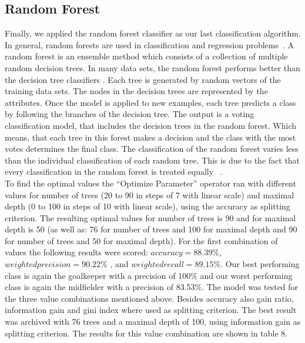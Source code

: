 \subsection{Random Forest}
Finally, we applied the random forest classifier as our last classification algorithm. In general, random forests are used in classification and regression problems~\cite{ref_rapidminerRandomForest}.
A random forest is an ensemble method which consists of a collection of multiple random decision trees. In many data sets, the random forest performs better than the decision tree classifiers \cite{ref_Tan}. 
Each tree is generated by random vectors of the training data sets. The nodes in the decision trees are represented by the attributes. \newline 
Once the model is applied to new examples, each tree predicts a class by following the branches of the decision tree. The output is a voting classification model, that includes the decision trees in the random forest. Which means, that each tree in this forest makes a decision and the class with the most votes determines the final class. The classification of the random forest varies less than the individual classification of each random tree. This is due to the fact that every classification in the random forest is treated equally ~\cite{ref_rapidminerRandomForest}. \\
To find the optimal values the ``Optimize Parameter'' operator ran with different values for number of trees (20 to 90 in steps of 7 with linear scale) and maximal depth (0 to 100 in steps of 10 with linear scale), using the accuracy as splitting criterion. The resulting optimal values for number of trees is 90 and for maximal depth is 50 (as well as: 76 for number of trees and 100 for maximal depth and 90 for number of trees and 50 for maximal depth). 
For the first combination of values the following results were scored: $accuracy = 88.39\%$, $weighted precision = 90.22\%$ , and $weighted recall = 89.15\%$. Our best performing class is again the goalkeeper with a precision of 100\% and our worst performing class is again the midfielder with a precision of 83.53\%. The model was tested for the three
value combinations mentioned above. 
Besides accuracy also gain ratio, information gain and gini index where used as splitting criterion. 
The best result was archived with 76 trees and a maximal depth of 100, using information gain as splitting criterion. 
The results for this value combination are shown in table 8.
